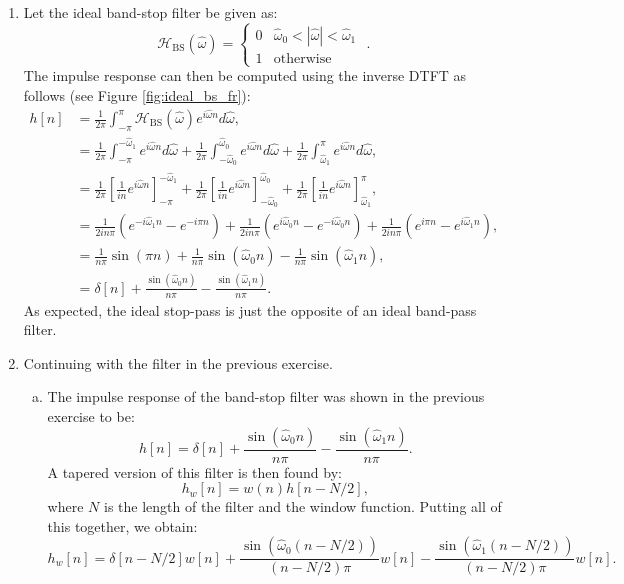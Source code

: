 \begin{enumerate}
\item Let the ideal band-stop filter be given as:
\begin{equation*}
\mathcal{H}_{\mathrm{BS}}(\hat{\omega}) = \left\{ \begin{array}{cc}
0 & \hat{\omega}_0 < |\hat{\omega}| < \hat{\omega}_1 \\
1 & \mathrm{otherwise}
\end{array}\right.\,\,.
\end{equation*}
The impulse response can then be computed using the inverse DTFT as follows (see Figure \ref{fig:ideal_bs_fr}):
\begin{align*}
    h[n]&=\frac{1}{2\pi}\int_{-\pi}^{\pi}\mathcal{H}_{\mathrm{BS}}(\hat{\omega})e^{i\hat{\omega}n}d\hat{\omega}, \\
    &=\frac{1}{2\pi}\int_{-\pi}^{-\hat{\omega}_{1}}e^{i\hat{\omega}n}d\hat{\omega} + \frac{1}{2\pi}\int_{-\hat{\omega}_{0}}^{\hat{\omega}_{0}}e^{i\hat{\omega}n}d\hat{\omega} + \frac{1}{2\pi}\int_{\hat{\omega}_{1}}^{\pi}e^{i\hat{\omega}n}d\hat{\omega}, \\
    &=\frac{1}{2\pi}\left[\frac{1}{in}e^{i\hat{\omega}n}\right]_{-\pi}^{-\hat{\omega}_{1}} + \frac{1}{2\pi}\left[\frac{1}{in}e^{i\hat{\omega}n}\right]_{-\hat{\omega}_{0}}^{\hat{\omega}_{0}} + \frac{1}{2\pi}\left[\frac{1}{in}e^{i\hat{\omega}n}\right]_{\hat{\omega}_{1}}^{\pi}, \\
    &=\frac{1}{2in\pi}\left(e^{-i\hat{\omega}_{1}n}-e^{-i\pi n}\right) + \frac{1}{2in\pi}\left(e^{i\hat{\omega}_{0}n}-e^{-i\hat{\omega}_{0}n}\right) + \frac{1}{2in\pi}\left(e^{i\pi n}-e^{i\hat{\omega}_{1}n}\right), \\
    &=\frac{1}{n\pi}\sin(\pi n) + \frac{1}{n\pi}\sin(\hat{\omega}_{0}n) - \frac{1}{n\pi}\sin(\hat{\omega}_{1}n), \\
    &=\delta[n] + \frac{\sin(\hat{\omega}_{0}n)}{n\pi} - \frac{\sin(\hat{\omega}_{1}n)}{n\pi}.
\end{align*}
As expected, the ideal stop-pass is just the opposite of an ideal band-pass filter. 


\item Continuing with the filter in the previous exercise. 

\begin{enumerate}[a)]
\item The impulse response of the band-stop filter was shown in the previous exercise to be:
$$h[n]=\delta[n] + \frac{\sin(\hat{\omega}_{0}n)}{n\pi} - \frac{\sin(\hat{\omega}_{1}n)}{n\pi}.$$
A tapered version of this filter is then found by:
$$h_{w}[n]=w(n)h[n - N/2],$$
where $N$ is the length of the filter and the window function. Putting all of this together, we obtain: 
$$h_{w}[n]=\delta[n-N/2]w[n] +  \frac{\sin(\hat{\omega}_{0}(n-N/2))}{(n-N/2)\pi}w[n] - \frac{\sin(\hat{\omega}_{1}(n-N/2))}{(n-N/2)\pi}w[n].$$


\end{enumerate}
\end{enumerate}
